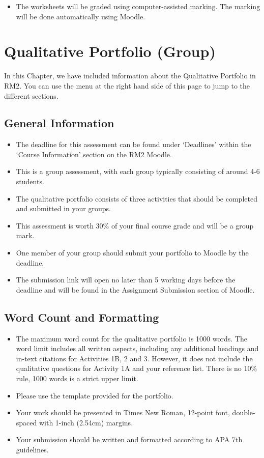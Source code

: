 \documentclass[
  english,
  letterpaper,
  DIV=11,
  numbers=noendperiod]{scrreprt}
\providecommand{\tightlist}{%
  \setlength{\itemsep}{0pt}\setlength{\parskip}{0pt}}
\begin{document}
\begin{itemize}
\tightlist
\item
  The worksheets will be graded using computer-assisted marking. The
  marking will be done automatically using Moodle.
\end{itemize}

\chapter{Qualitative Portfolio (Group)}\label{ch3_AIS_portfolio}

In this Chapter, we have included information about the Qualitative
Portfolio in RM2. You can use the menu at the right hand side of this
page to jump to the different sections.

\section{General Information}\label{general-information-2}

\begin{itemize}
\item
  The deadline for this assessment can be found under `Deadlines' within
  the `Course Information' section on the RM2 Moodle.
\item
  This is a group assessment, with each group typically consisting of
  around 4-6 students.
\item
  The qualitative portfolio consists of three activities that should be
  completed and submitted in your groups.
\item
  This assessment is worth 30\% of your final course grade and will be a
  group mark.
\item
  One member of your group should submit your portfolio to Moodle by the
  deadline.
\item
  The submission link will open no later than 5 working days before the
  deadline and will be found in the Assignment Submission section of
  Moodle.
\end{itemize}

\section{Word Count and Formatting}\label{word-count-and-formatting}

\begin{itemize}
\item
  The maximum word count for the qualitative portfolio is 1000 words.
  The word limit includes all written aspects, including any additional
  headings and in-text citations for Activities 1B, 2 and 3. However, it
  does not include the qualitative questions for Activity 1A and your
  reference list. There is no 10\% rule, 1000 words is a strict upper
  limit.
\item
  Please use the template provided for the portfolio.
\item
  Your work should be presented in Times New Roman, 12-point font,
  double-spaced with 1-inch (2.54cm) margins.
\item
  Your submission should be written and formatted according to APA 7th
  guidelines.
\end{itemize}
\end{document}
